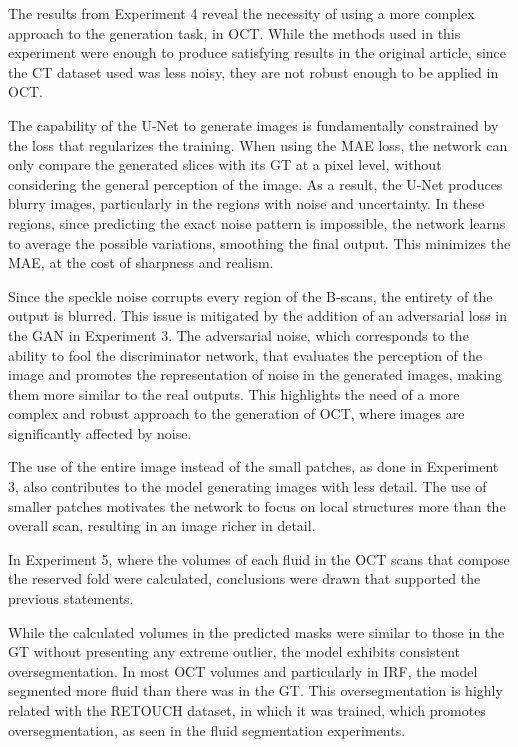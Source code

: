 The results from Experiment 4 reveal the necessity of using a more complex approach to the generation task, in OCT. While the methods used in this experiment were enough to produce satisfying results in the original article, since the CT dataset used was less noisy, they are not robust enough to be applied in OCT.
\par
The capability of the U-Net to generate images is fundamentally constrained by the loss that regularizes the training. When using the MAE loss, the network can only compare the generated slices with its GT at a pixel level, without considering the general perception of the image. As a result, the U-Net produces blurry images, particularly in the regions with noise and uncertainty. In these regions, since predicting the exact noise pattern is impossible, the network learns to average the possible variations, smoothing the final output. This minimizes the MAE, at the cost of sharpness and realism.
\par
Since the speckle noise corrupts every region of the B-scans, the entirety of the output is blurred. This issue is mitigated by the addition of an adversarial loss in the GAN in Experiment 3. The adversarial noise, which corresponds to the ability to fool the discriminator network, that evaluates the perception of the image and promotes the representation of noise in the generated images, making them more similar to the real outputs. This highlights the need of a more complex and robust approach to the generation of OCT, where images are significantly affected by noise.
\par
The use of the entire image instead of the small patches, as done in Experiment 3, also contributes to the model generating images with less detail. The use of smaller patches motivates the network to focus on local structures more than the overall scan, resulting in an image richer in detail.
\par
In Experiment 5, where the volumes of each fluid in the OCT scans that compose the reserved fold were calculated, conclusions were drawn that supported the previous statements. 
\par
While the calculated volumes in the predicted masks were similar to those in the GT without presenting any extreme outlier, the model exhibits consistent oversegmentation. In most OCT volumes and particularly in IRF, the model segmented more fluid than there was in the GT. This oversegmentation is highly related with the RETOUCH dataset, in which it was trained, which promotes oversegmentation, as seen in the fluid segmentation experiments. 
